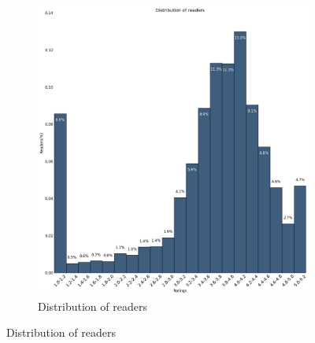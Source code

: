 \documentclass[11pt]{article}
\begin{document}
\begin{figure}
\begin{subfigure}[b]{0.4\textwidth}
                \includegraphics[width=\textwidth]{images/user_ratings}
                \caption{Distribution of readers}
        \end{subfigure}


\end{figure}
\end{document}
